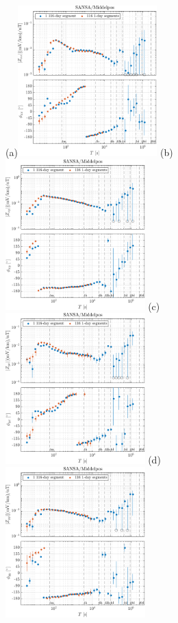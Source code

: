 \documentclass[draft,linenumbers]{agujournal2018}
\begin{document}
\begin{figure}[h!]
  \vspace{-1em}
  \subfigure(a){\includegraphics[width=0.48\textwidth]{figures/zplot-magnitude_phase-Middelpos-tf1-Z_xx.pdf}} 
  \subfigure(b){\includegraphics[width=0.48\textwidth]{figures/zplot-magnitude_phase-Middelpos-tf1-Z_xy.pdf}} 
  \subfigure(c){\includegraphics[width=0.48\textwidth]{figures/zplot-magnitude_phase-Middelpos-tf1-Z_yx.pdf}} 
  \subfigure(d){\includegraphics[width=0.48\textwidth]{figures/zplot-magnitude_phase-Middelpos-tf1-Z_yy.pdf}} 


\end{figure}
\end{document}
